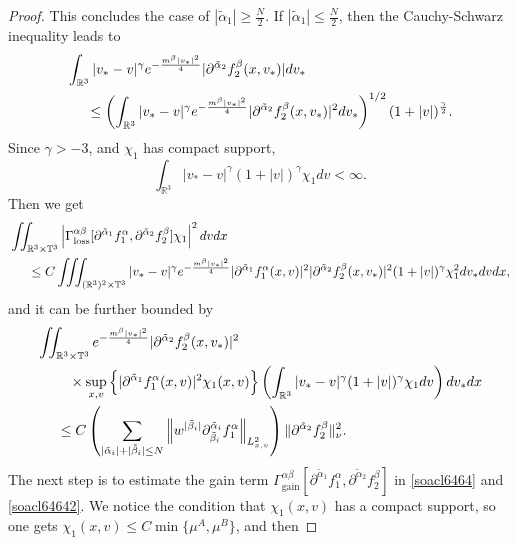 \documentclass[reqno]{amsart}
\numberwithin{equation}{section}
\numberwithin{equation}{section}
\begin{document}
\begin{proof}
		This concludes the case of $ |\tilde{\alpha}_1| \geq \frac{N}{2} $. If $ |\tilde{\alpha}_1| \leq \frac{N}{2} $, then the Cauchy-Schwarz inequality leads to
		\begin{align*}
		&\int_{\mathbb{R}^3} |v_* - v|^\gamma e^{-\frac{m^{\beta}|v_*|^2}{4}} |\partial^{\tilde{\alpha}_2}f^{\beta}_2 (x,v_*)| dv_*\\
		&\hspace{0.5cm}\leq \left( \int_{\mathbb{R}^3} |v_* - v|^\gamma e^{-\frac{m^{\beta}|v_*|^2}{4}} |\partial^{\tilde{\alpha}_2}f^{\beta}_2 (x,v_*)|^2 dv_* \right)^{1/2} (1 + |v|)^{\frac{\gamma}{2}}.
		\end{align*}
		Since \( \gamma > -3 \), and \( \chi_1 \) has compact support,
		\begin{equation*}
			\int_{\mathbb{R}^3}  |v_* - v|^\gamma (1 + |v|)^\gamma \chi_1 dv < \infty.
		\end{equation*}	
		Then we get 
		\begin{align*}
		&\iint_{\mathbb{R}^3\times\mathbb{T}^3}  \left| \Gamma_{\text{loss}}^{\alpha \beta} [\partial^{\tilde{\alpha}_1}f^{\alpha}_1, \partial^{\tilde{\alpha}_2}f^{\beta}_2] \chi_1 \right|^2  dv dx \\
		&\hspace{0.5cm}\leq C \iiint_{(\mathbb{R}^3)^2\times\mathbb{T}^3} |v_* - v|^\gamma e^{-\frac{m^{\beta}|v_*|^2}{4}} |\partial^{\tilde{\alpha}_1}f^{\alpha}_1(x,v)|^2 |\partial^{\tilde{\alpha}_2}f^{\beta}_2 (x,v_*)|^2  (1 + |v|)^\gamma \chi_1^2 dv_* dv dx,
		\end{align*}
		and it can be further bounded by
		\begin{align*}
		&\iint_{\mathbb{R}^3\times\mathbb{T}^3} e^{-\frac{m^{\beta}|v_*|^2}{4}} |\partial^{\tilde{\alpha}_2}f^{\beta}_2 (x,v_*)|^2\\
		&\hspace{0.8cm}\times \sup_{x,v} \Big\{ |\partial^{\tilde{\alpha}_1}f^{\alpha}_1(x,v)|^2 \chi_1(x, v)\Big\} \left( \int_{\mathbb{R}^3} |v_* - v|^\gamma (1 + |v|)^\gamma \chi_1 dv \right) dv_* dx\\
		&\hspace{0.5cm}\leq C  \left( \sum_{| \tilde{\alpha}_i |+| \tilde{\beta}_i | \leq N} \left\| w^{| \tilde{\beta}_i |} \partial_{\tilde{\beta}_i}^{\tilde{\alpha}_i} f^{\alpha}_1\right\|_{L^{2}_{x,v}} \right) \|\partial^{\tilde{\alpha}_2}f^{\beta}_2\|_{\nu}^2.
		\end{align*}
		The next step is to estimate the gain term  $\Gamma_{\text{gain}}^{\alpha \beta} [\partial^{\tilde{\alpha}_1}f^{\alpha}_1, \partial^{\tilde{\alpha}_2}f^{\beta}_2]$ in \eqref{soacl6464} and \eqref{soacl64642}. We notice the condition that $\chi_1(x,v)$ has a compact support, so one gets $\chi_1(x,v)\leq C\min \{\mu^A ,\mu^B \}$, and then


\end{proof}
\end{document}
